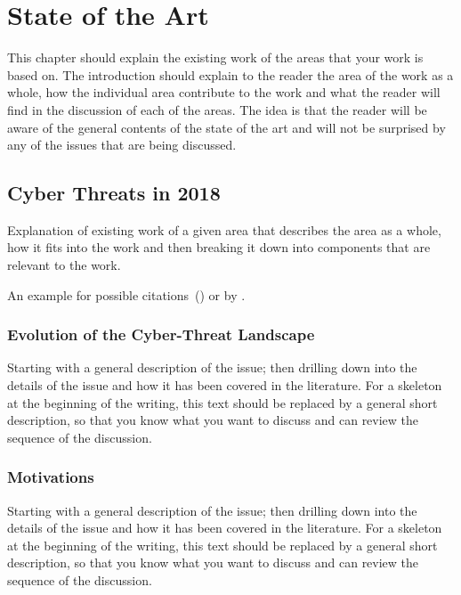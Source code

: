 \chapter{State of the Art}

This chapter should explain the existing work of the areas that your work is based on. The introduction should explain to the reader the area of the work as a whole, how the individual area contribute to the work and what the reader will find in the discussion of each of the areas. The idea is that the reader will be aware of the general contents of the state of the art and will not be surprised by any of the issues that are being discussed.


\section{Cyber Threats in 2018}

Explanation of existing work of a given area that describes the area as a whole, how it fits into the work and then breaking it down into components that are relevant to the work.

An example for possible citations~(\cite{Andrew2013empirical}) or by \cite{Asghari2015Economics}.

\subsection{Evolution of the Cyber-Threat Landscape}

Starting with a general description of the issue; then drilling down into the details of the issue and how it has been covered in the literature. For a skeleton at the beginning of the writing, this text should be replaced by a general short description, so that you know what you want to discuss and can review the sequence of the discussion.

\subsection{Motivations}

Starting with a general description of the issue; then drilling down into the details of the issue and how it has been covered in the literature. For a skeleton at the beginning of the writing, this text should be replaced by a general short description, so that you know what you want to discuss and can review the sequence of the discussion.

